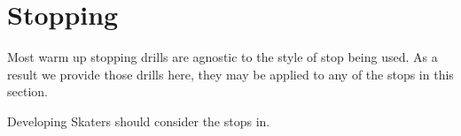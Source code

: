 \chapter{Stopping}
\label{ch:stopping}


Most warm up stopping drills are agnostic to the style of stop being used. 
As a result we provide those drills here, they may be applied to any of the stops in this section.  


Developing Skaters should consider the stops in. 
 

